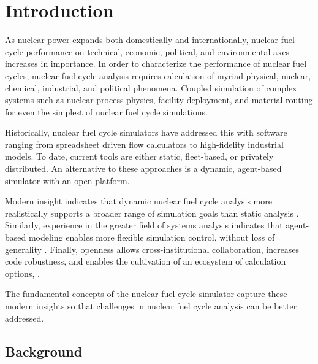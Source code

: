 
\section{Introduction}


As nuclear power expands both domestically and internationally, nuclear fuel cycle
performance on technical, economic, political, and environmental axes increases 
in importance. In order to characterize the performance of nuclear fuel cycles, 
nuclear fuel cycle analysis requires calculation of myriad physical, nuclear, 
chemical, industrial, and political 
phenomena. Coupled simulation of complex systems such as nuclear process physics, 
facility deployment, and material routing
for even the simplest of nuclear fuel cycle simulations. 

Historically, nuclear fuel cycle simulators have addressed this with software 
ranging from spreadsheet driven flow calculators to high-fidelity industrial 
models. To date, current tools are either static, fleet-based, or 
privately distributed. An alternative to these approaches is a dynamic, 
agent-based simulator with an open platform. 

Modern insight indicates that dynamic nuclear fuel cycle analysis more 
realistically supports a broader range of simulation goals than static analysis 
\cite{piet_dynamic_2011}. Similarly, experience in the greater field of systems 
analysis indicates that agent-based modeling enables more flexible simulation 
control, without loss of generality \cite{thatpapermattsent}. Finally, 
openness allows cross-institutional collaboration, increases code robustness, 
and enables the cultivation of an ecosystem of calculation options, 
\cite{softwarecarpentryresource}.  

The fundamental concepts of the \Cyclus nuclear fuel cycle simulator capture 
these modern insights so that challenges in nuclear fuel cycle analysis can be 
better addressed. 

\subsection{Background}

